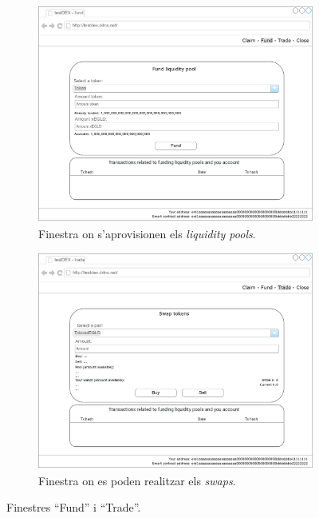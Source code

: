 \documentclass[11pt,a4paper]{article}
\begin{document}
\begin{figure}[!htb]
\begin{subfigure}[b]{0.47\textwidth}
  \includegraphics[width=\linewidth]{screen_fund.png}
  \caption{Finestra on s'aprovisionen els \textit{liquidity pools}.}\label{fig:screenfund}
\end{subfigure}\hfill
\begin{subfigure}[b]{0.47\textwidth}
  \includegraphics[width=\linewidth]{screen_trade.png}
  \caption{Finestra on es poden realitzar els \textit{swaps}.}\label{fig:screentrade}
\end{subfigure}\hfill
\caption{Finestres ``Fund'' i ``Trade''.}
\end{figure}
\end{document}
